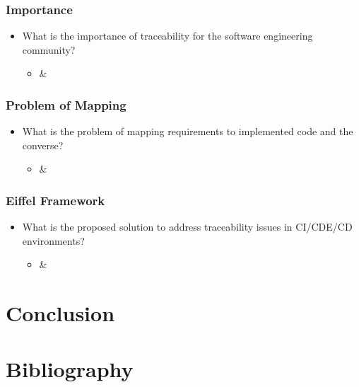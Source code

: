 \documentclass[12pt,a4paper]{article}
\begin{document}
        \subsubsection{Importance}
        \begin{itemize}[noitemsep]
            \item What is the importance of traceability for the software engineering community?
            \begin{itemize}
                \item \cite{stahl_2017} \& \cite{stahl_hallen_bosch_2016}
            \end{itemize}
        \end{itemize}
        \subsubsection{Problem of Mapping}
        \begin{itemize}[noitemsep]
            \item What is the problem of mapping requirements to implemented code and the converse?
            \begin{itemize}
                \item \cite{stahl_2017} \& \cite{stahl_hallen_bosch_2016}
            \end{itemize}
        \end{itemize}
        \subsubsection{Eiffel Framework}
        \begin{itemize}[noitemsep]
            \item What is the proposed solution to address traceability issues in CI/CDE/CD environments?
            \begin{itemize}
                \item \cite{stahl_2017} \& \cite{stahl_hallen_bosch_2016}
            \end{itemize}
        \end{itemize}

\section{Conclusion}

\newpage
\section{Bibliography}
\nocite{*}


\end{document}
